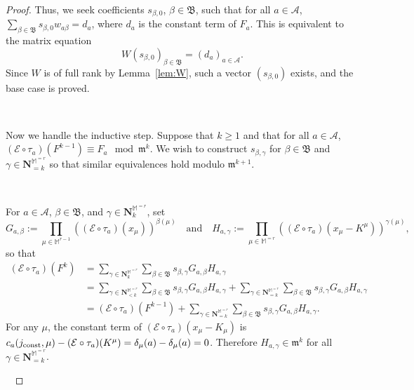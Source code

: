 \documentclass[10pt]{amsart}
\theoremstyle{Theorem}
\theoremstyle{definition}
\newcommand{\NN}{\mathbf N}
\newcommand{\fm}{\mathfrak{m}}
\newcommand{\cA}{\mathcal{A}}
\newcommand{\cE}{\mathcal{E}}
\def\cs{s}
\begin{document}
\begin{proof}
Thus, we seek coefficients $\cs_{\beta,0}$, $\beta\in \mathfrak{B}$, such that for all $a \in \mathcal{A}$, $\sum_{\beta \in \mathfrak{B}} \cs_{\beta,0} w_{a \beta} = d_a$, where $d_a$ is the constant term of $F_a$.  This is equivalent to the matrix equation 
\begin{equation*}
W(\cs_{\beta,0})_{\beta \in \mathfrak{B}} = (d_a)_{a\in \mathcal{A}}.
\end{equation*}
Since $W$ is of full rank by Lemma~\ref{lem:W}, such a vector $(\cs_{\beta,0})$ exists, and the base case is proved.

\ 


Now we handle the inductive step. Suppose that $k\geq 1$ and that for all $a\in\cA$, $(\cE\circ \tau_a)(F^{k-1}) \equiv F_a \mod \fm^k$.  We wish to construct $\cs_{\beta,\gamma}$ for $\beta\in\mathfrak{B}$ and $\gamma\in \NN_{=k}^{\mathbb{M}^{=r}}$ so that similar equivalences hold modulo $\fm^{k+1}$. 

\ 



For $a\in \cA$, $\beta\in\mathfrak{B}$, and $\gamma\in \NN_k^{\mathbb{M}^{=r}}$, set 
\[G_{a,\beta} := \prod_{\mu \in \mathbb{M}^{r-1}} \left((\cE\circ \tau_a)(x_\mu)\right)^{\beta(\mu)}\quad \text{and}\quad H_{a,\gamma} := \prod_{\mu \in \mathbb{M}^{=r}}\left((\cE\circ \tau_a)(x_\mu - K^\mu)\right)^{\gamma(\mu)},\] so that
\begin{align*}(\cE\circ \tau_a)(F^k) &= \sum_{\gamma\in \NN_{k}^{\mathbb{M}^{=r}}}\sum_{\beta \in \mathfrak{B}} \cs_{\beta,\gamma}G_{a,\beta}H_{a,\gamma}\\
& = \sum_{\gamma\in \NN_{<k}^{\mathbb{M}^{=r}}}\sum_{\beta \in \mathfrak{B}} \cs_{\beta,\gamma}G_{a,\beta}H_{a,\gamma} + \sum_{\gamma\in \NN_{=k}^{\mathbb{M}^{=r}}}\sum_{\beta \in \mathfrak{B}} \cs_{\beta,\gamma}G_{a,\beta}H_{a,\gamma} \\
&= (\cE\circ \tau_a)(F^{k-1}) + \sum_{\gamma\in \NN_{=k}^{\mathbb{M}^{=r}}}\sum_{\beta \in \mathfrak{B}} \cs_{\beta,\gamma}G_{a,\beta}H_{a,\gamma}.
\end{align*}
For any $\mu$, the constant term of $(\cE\circ \tau_a)(x_\mu - K_\mu)$ is $c_a(j_\textup{const},\mu) - (\cE\circ \tau_a)(K^\mu) = \delta_\mu(a)- \delta_\mu(a) = 0$.  Therefore $H_{a,\gamma}\in \fm^k$ for all $\gamma\in \NN_{=k}^{\mathbb{M}^{=r}}$. 

\ 


\end{proof}
\end{document}

